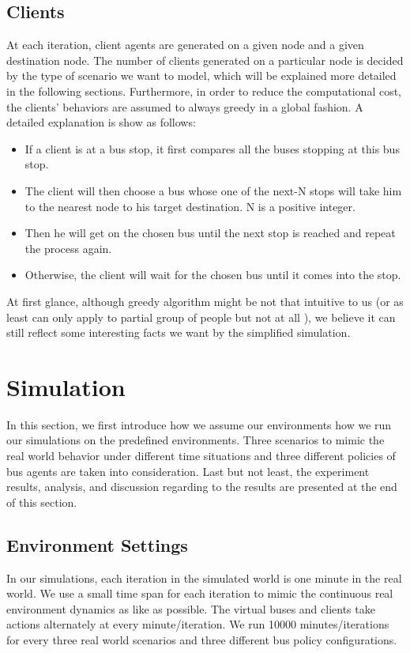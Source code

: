 \documentclass{sig-alternate}
\begin{document}
\subsection{Clients}
At each iteration, client agents are generated on a given node and a given destination node.
The number of clients generated on a particular node is decided by the type of scenario we want to model, which will be explained more detailed in the following sections.
Furthermore, in order to reduce the computational cost, the clients' behaviors are assumed to always greedy in a global fashion.
A detailed explanation is show as follows:
\begin{itemize}
\item If a client is at a bus stop, it first compares all the buses stopping at this bus stop.
\item The client will then choose a bus whose one of the next-N stops will take him to the nearest node to his target destination. N is a positive integer. 
\item Then he will get on the chosen bus until the next stop is reached and repeat the process again.
\item Otherwise, the client will wait for the chosen bus until it comes into the stop.
\end{itemize}
At first glance, although greedy algorithm might be not that intuitive to us (or as least can only apply to partial group of people but not at all ),
we believe it can still reflect some interesting facts we want by the simplified simulation.


\section{Simulation}
In this section, we first introduce how we assume our environments how we run our simulations on the predefined environments.
Three scenarios to mimic the real world behavior under different time situations  and three different policies of bus agents are taken into consideration.
Last but not least, the experiment results, analysis, and discussion regarding to the results are presented at the end of this section.

\subsection{Environment Settings}
In our simulations, each iteration in the simulated world is one minute in the real world. We use a small time span for each iteration to mimic the continuous real environment dynamics as like as possible.
The virtual buses and clients take actions alternately at every minute/iteration.
We run 10000 minutes/iterations for every three real world scenarios and three different bus policy configurations.
\end{document}
